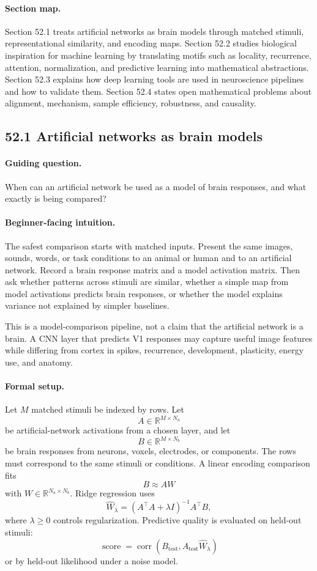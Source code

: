 \paragraph{Section map.}
Section 52.1 treats artificial networks as brain models through matched stimuli, representational similarity, and encoding maps. Section 52.2 studies biological inspiration for machine learning by translating motifs such as locality, recurrence, attention, normalization, and predictive learning into mathematical abstractions. Section 52.3 explains how deep learning tools are used in neuroscience pipelines and how to validate them. Section 52.4 states open mathematical problems about alignment, mechanism, sample efficiency, robustness, and causality.

\subsection{52.1 Artificial networks as brain models}

\paragraph{Guiding question.}
When can an artificial network be used as a model of brain responses, and what exactly is being compared?

\paragraph{Beginner-facing intuition.}
The safest comparison starts with matched inputs. Present the same images, sounds, words, or task conditions to an animal or human and to an artificial network. Record a brain response matrix and a model activation matrix. Then ask whether patterns across stimuli are similar, whether a simple map from model activations predicts brain responses, or whether the model explains variance not explained by simpler baselines.

This is a model-comparison pipeline, not a claim that the artificial network is a brain. A CNN layer that predicts V1 responses may capture useful image features while differing from cortex in spikes, recurrence, development, plasticity, energy use, and anatomy.

\paragraph{Formal setup.}
Let \(M\) matched stimuli be indexed by rows. Let
\[
A\in\mathbb R^{M\times N_a}
\]
be artificial-network activations from a chosen layer, and let
\[
B\in\mathbb R^{M\times N_b}
\]
be brain responses from neurons, voxels, electrodes, or components. The rows must correspond to the same stimuli or conditions. A linear encoding comparison fits
\[
B\approx AW
\]
with \(W\in\mathbb R^{N_a\times N_b}\). Ridge regression uses
\[
\widehat W_\lambda=(A^\top A+\lambda I)^{-1}A^\top B,
\]
where \(\lambda\geq0\) controls regularization. Predictive quality is evaluated on held-out stimuli:
\[
\operatorname{score}=\operatorname{corr}\!\left(B_{\mathrm{test}},A_{\mathrm{test}}\widehat W_\lambda\right)
\]
or by held-out likelihood under a noise model.

